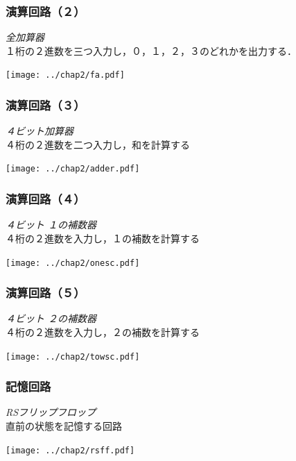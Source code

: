 \documentclass{beamer}                 %
\begin{document}
\begin{frame}
  \frametitle{演算回路（２）}
  \emph{全加算器} \\
  １桁の２進数を三つ入力し，０，１，２，３のどれかを出力する．
  \vfill
  \begin{center}
    \texttt{[image: ../chap2/fa.pdf]}
  \end{center}
\end{frame}

\begin{frame}
  \frametitle{演算回路（３）}
  \emph{４ビット加算器} \\
  ４桁の２進数を二つ入力し，和を計算する
  \vfill
  \begin{center}
    \texttt{[image: ../chap2/adder.pdf]}
  \end{center}
\end{frame}

\begin{frame}
  \frametitle{演算回路（４）}
  \emph{４ビット １の補数器} \\
  ４桁の２進数を入力し，１の補数を計算する
  \vfill
  \begin{center}
    \texttt{[image: ../chap2/onesc.pdf]}
  \end{center}
\end{frame}

\begin{frame}
  \frametitle{演算回路（５）}
  \emph{４ビット ２の補数器} \\
  ４桁の２進数を入力し，２の補数を計算する
  \vfill
  \begin{center}
    \texttt{[image: ../chap2/towsc.pdf]}
  \end{center}
\end{frame}

\begin{frame}
  \frametitle{記憶回路}
  \emph{RSフリップフロップ} \\
  直前の状態を記憶する回路
  \vfill
  \begin{center}
    \texttt{[image: ../chap2/rsff.pdf]}
  \end{center}
\end{frame}
\end{document}
